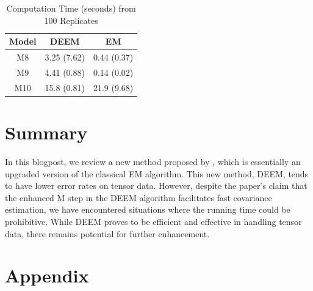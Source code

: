 \documentclass[11pt]{article}
\begin{document}
\begin{table}[H]
    \centering
    \begin{tabular}{c|cc}
       Model  &  DEEM & EM \\
       \hline
         M8 & 3.25 (7.62) & 0.44 (0.37) \\
         M9 &  4.41 (0.88) & 0.14 (0.02) \\
         M10 &  15.8 (0.81) & 21.9 (9.68) \\ 
    \end{tabular}
    \caption{Computation Time (seconds) from 100 Replicates}
    \label{tab:time2}
\end{table}

\section{Summary}

In this blogpost, we review a new method proposed by \cite{mai2022DEEM}, which is essentially an upgraded version of the classical EM algorithm. This new method, DEEM, tends to have lower error rates on tensor data. However, despite the paper's claim that the enhanced M step in the DEEM algorithm facilitates fast covariance estimation, we have encountered situations where the running time could be prohibitive. While DEEM proves to be efficient and effective in handling tensor data, there remains potential for further enhancement.


\begin{singlespace}
	
	
\end{singlespace}

\section*{Appendix}
\end{document}
